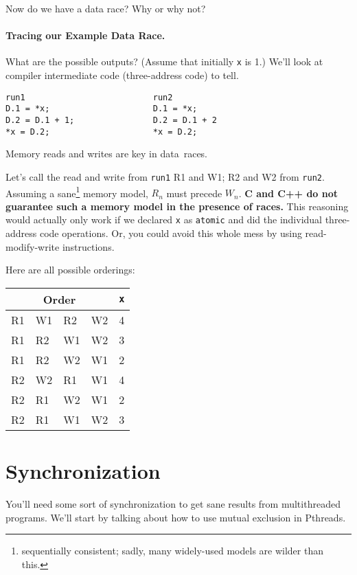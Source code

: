 Now do we have a data race? Why or why not?
\vspace*{2em}


\paragraph{Tracing our Example Data Race.} 
What are the possible outputs? (Assume that initially {\tt *x} is 1.)
We'll look at compiler intermediate code (three-address code) to tell.

\hspace*{.2\textwidth}\begin{minipage}{.8\textwidth}
\begin{verbatim}
run1                          run2   
D.1 = *x;                     D.1 = *x;
D.2 = D.1 + 1;                D.2 = D.1 + 2
*x = D.2;                     *x = D.2;
  \end{verbatim}
\end{minipage}

Memory reads and writes are key in data~races.

Let's call the read and write from {\tt run1} R1 and W1; R2 and W2
from {\tt run2}. Assuming a sane\footnote{sequentially consistent; sadly, many
widely-used models are wilder than this.}
memory model, $R_n$ must precede $W_n$. {\bf C and C++ do not guarantee
  such a memory model in the presence of races.} This reasoning would
actually only work if we declared {\tt x} as {\tt atomic} and did the
individual three-address code operations. Or, you could avoid this whole
mess by using read-modify-write instructions.

Here are all possible orderings:
  \begin{center}
    \begin{tabular}{llll|l}
\multicolumn{4}{c|}{Order} & {\tt *x}\\
\hline
R1 & W1 & R2 & W2 & 4 \\
R1 & R2 & W1 & W2 & 3 \\
R1 & R2 & W2 & W1 & 2 \\
R2 & W2 & R1 & W1 & 4 \\
R2 & R1 & W2 & W1 & 2 \\
R2 & R1 & W1 & W2 & 3 \\
    \end{tabular}
  \end{center}


\section*{Synchronization}
You'll need some sort of synchronization to get sane results from
multithreaded programs. We'll start by talking about how to use
mutual exclusion in Pthreads.


